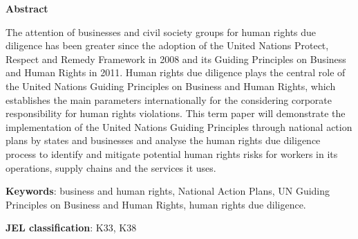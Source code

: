 \thispagestyle{plain}
\textbf{Abstract}

The attention of businesses and civil society groups for human rights due diligence has been greater since the adoption of the United Nations Protect, Respect and Remedy Framework in 2008 and its Guiding Principles on Business and Human Rights in 2011. Human rights due diligence plays the central role of the United Nations Guiding Principles on Business and Human Rights, which establishes the main parameters internationally for the considering corporate responsibility for human rights violations. This term paper will demonstrate the implementation of the United Nations Guiding Principles through national action plans by states and businesses and analyse the human rights due diligence process to identify and mitigate potential human rights risks for workers in its operations, supply chains and the services it uses.

\vspace{1cm}
\textbf{Keywords}: business and human rights, National Action Plans, UN Guiding Principles on Business and Human Rights, human rights due diligence.

\vspace{1cm}
\textbf{JEL classification}: K33, K38
